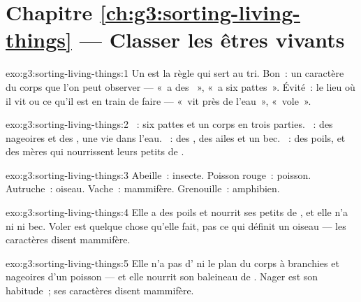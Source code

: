 \section*{Chapitre \ref{ch:g3:sorting-living-things} --- Classer les êtres vivants}

\begin{solution}{exo:g3:sorting-living-things:1}
Un  est la règle qui sert au tri. Bon~: un caractère du corps
que l'on peut observer --- «~a des ~», «~a six pattes~».
Évité~: le lieu où il vit ou ce qu'il est en train de faire --- «~vit
près de l'eau~», «~vole~».
\end{solution}

\begin{solution}{exo:g3:sorting-living-things:2}
~: six pattes et un corps en trois parties. ~: des
nageoires et des , une vie dans l'eau. ~: des ,
des ailes et un bec. ~: des poils, et des mères qui
nourrissent leurs petits de .
\end{solution}

\begin{solution}{exo:g3:sorting-living-things:3}
Abeille~: insecte. Poisson rouge~: poisson. Autruche~: oiseau.
Vache~: mammifère. Grenouille~: amphibien.
\end{solution}

\begin{solution}{exo:g3:sorting-living-things:4}
Elle a des poils et nourrit ses petits de , et elle n'a ni
 ni bec. Voler est quelque chose qu'elle fait, pas ce qui
définit un oiseau --- les caractères disent mammifère.
\end{solution}

\begin{solution}{exo:g3:sorting-living-things:5}
Elle n'a pas d' ni le plan du corps à branchies et
nageoires d'un poisson --- et elle nourrit son baleineau de .
Nager est son habitude~; ses caractères disent mammifère.
\end{solution}

